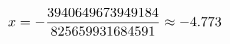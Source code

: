 \documentclass[preview]{standalone}
\begin{document}
\begin{align*}
\special{dvisvgm:raw <g id='unique000'>}x = - \frac{3940649673949184}{825659931684591} \approx -4.773\special{dvisvgm:raw </g>}
\end{align*}
\end{document}
